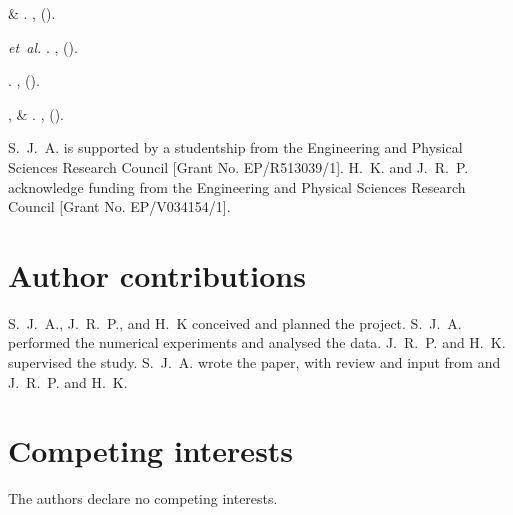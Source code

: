 \documentclass[twocolumn,10pt]{revtex4}
\begin{document}
\begin{thebibliography}{10}
 \& 
\newblock {}.
\newblock \emph{}
  \textbf{}, 
  ().

 \emph{et~al.}
\newblock {}.
\newblock \emph{} \textbf{},
   ().

\newblock {}.
\newblock \emph{}
  \textbf{}, 
  ().

,  \&
\newblock {}.
\newblock \emph{} \textbf{},
   ().

\end{thebibliography}

\begin{acknowledgments}
  S.~J.~A. is supported by a studentship from the Engineering and Physical Sciences Research Council [Grant No. EP/R513039/1].
  H.~K. and J.~R.~P. acknowledge funding from the Engineering and Physical Sciences Research Council [Grant No. EP/V034154/1].
\end{acknowledgments}

\section*{Author contributions}
S.~J.~A., J.~R.~P., and H.~K conceived and planned the project.
S.~J.~A. performed the numerical experiments and analysed the data.
J.~R.~P. and H.~K. supervised the study.
S.~J.~A. wrote the paper, with review and input from and J.~R.~P. and H.~K.

\section*{Competing interests}
The authors declare no competing interests.
\end{document}

